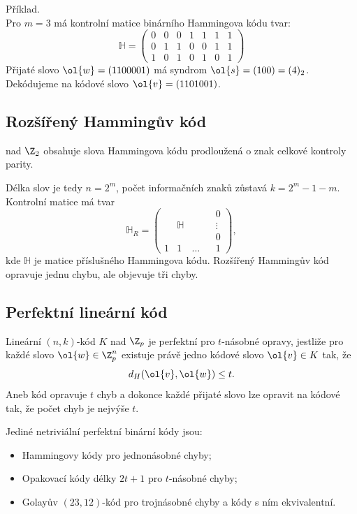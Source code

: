 Příklad.\\
Pro $m=3$ má kontrolní matice binárního Hammingova kódu tvar:
\begin{equation}
	\mathbb{H} =
	\begin{pmatrix}
	0 & 0 & 0 & 1 & 1 & 1 & 1 \\
	0 & 1 & 1 & 0 & 0 & 1 & 1 \\
	1 & 0 & 1 & 0 & 1 & 0 & 1
	\end{pmatrix}
\end{equation}
Přijaté slovo $\ol{w} = (1100001)$ má syndrom $\ol{s} = (100) = (4)_2$. \\
Dekódujeme na kódové slovo $\ol{v} = (1101001)$.

\subsection{Rozšířený Hammingův kód}
 nad $\Z_2$ obsahuje slova Hammingova kódu prodloužená o znak celkové kontroly parity.

Délka slov je tedy $n=2^m$, počet informačních znaků zůstavá $k = 2^m - 1 -m$. Kontrolní matice má tvar
\begin{equation}
	\mathbb{H}_R =
	\begin{pmatrix}
	& & & & 0 \\
	& \mathbb{H} & & & \vdots \\
	& & & & 0 \\
	1 & 1 & \hdots & & 1
	\end{pmatrix},
\end{equation}
kde $\mathbb{H}$ je matice příslušného Hammingova kódu. Rozšířený Hammingův kód opravuje jednu chybu, ale objevuje tři chyby.

\subsection{Perfektní lineární kód}
Lineární $(n,k)$-kód $K$ nad $\Z_p$ je perfektní pro $t$-násobné opravy, jestliže pro každé slovo $\ol{w} \in \Z_p^n$ existuje právě jedno kódové slovo $\ol{v} \in K$ tak, že
\begin{equation}
	d_H(\ol{v}, \ol{w}) \leq t.
\end{equation}
Aneb kód opravuje $t$ chyb a dokonce každé přijaté slovo lze opravit na kódové tak, že počet chyb je nejvýše $t$.

Jediné netriviální perfektní binární kódy jsou:
\vspace{-1em}
\begin{itemize}
	\item Hammingovy kódy pro jednonásobné chyby;
	\item Opakovací kódy délky $2t+1$ pro $t$-násobné chyby;
	\item Golayův $(23, 12)$-kód pro trojnásobné chyby a kódy s ním ekvivalentní.
\end{itemize}
